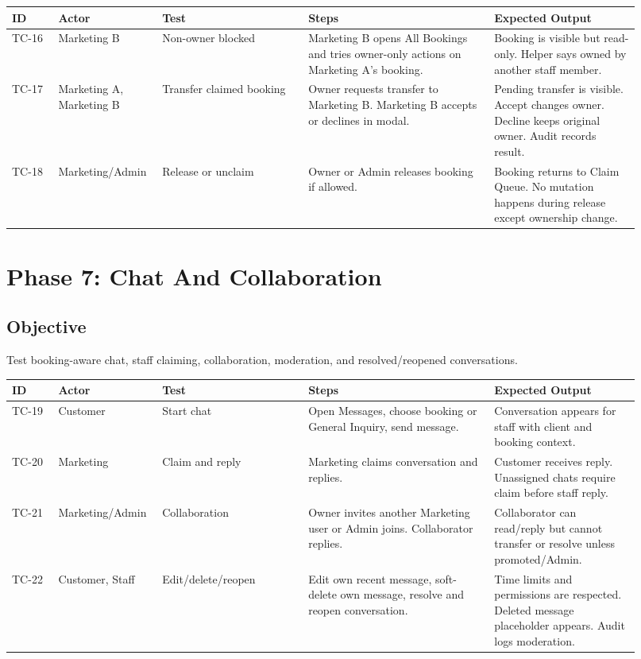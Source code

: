 \documentclass[11pt,a4paper]{article}
\begin{document}
\begin{longtable}{p{0.07\linewidth}p{0.13\linewidth}p{0.22\linewidth}p{0.28\linewidth}p{0.22\linewidth}}
\toprule
\textbf{ID} & \textbf{Actor} & \textbf{Test} & \textbf{Steps} & \textbf{Expected Output} \\
\midrule
TC-16 & Marketing B & Non-owner blocked & Marketing B opens All Bookings and tries owner-only actions on Marketing A's booking. & Booking is visible but read-only. Helper says owned by another staff member. \\
TC-17 & Marketing A, Marketing B & Transfer claimed booking & Owner requests transfer to Marketing B. Marketing B accepts or declines in modal. & Pending transfer is visible. Accept changes owner. Decline keeps original owner. Audit records result. \\
TC-18 & Marketing/Admin & Release or unclaim & Owner or Admin releases booking if allowed. & Booking returns to Claim Queue. No mutation happens during release except ownership change. \\
\bottomrule
\end{longtable}

\section{Phase 7: Chat And Collaboration}
\subsection{Objective}
Test booking-aware chat, staff claiming, collaboration, moderation, and resolved/reopened conversations.

\begin{longtable}{p{0.07\linewidth}p{0.13\linewidth}p{0.22\linewidth}p{0.28\linewidth}p{0.22\linewidth}}
\toprule
\textbf{ID} & \textbf{Actor} & \textbf{Test} & \textbf{Steps} & \textbf{Expected Output} \\
\midrule
TC-19 & Customer & Start chat & Open Messages, choose booking or General Inquiry, send message. & Conversation appears for staff with client and booking context. \\
TC-20 & Marketing & Claim and reply & Marketing claims conversation and replies. & Customer receives reply. Unassigned chats require claim before staff reply. \\
TC-21 & Marketing/Admin & Collaboration & Owner invites another Marketing user or Admin joins. Collaborator replies. & Collaborator can read/reply but cannot transfer or resolve unless promoted/Admin. \\
TC-22 & Customer, Staff & Edit/delete/reopen & Edit own recent message, soft-delete own message, resolve and reopen conversation. & Time limits and permissions are respected. Deleted message placeholder appears. Audit logs moderation. \\
\bottomrule
\end{longtable}
\end{document}
